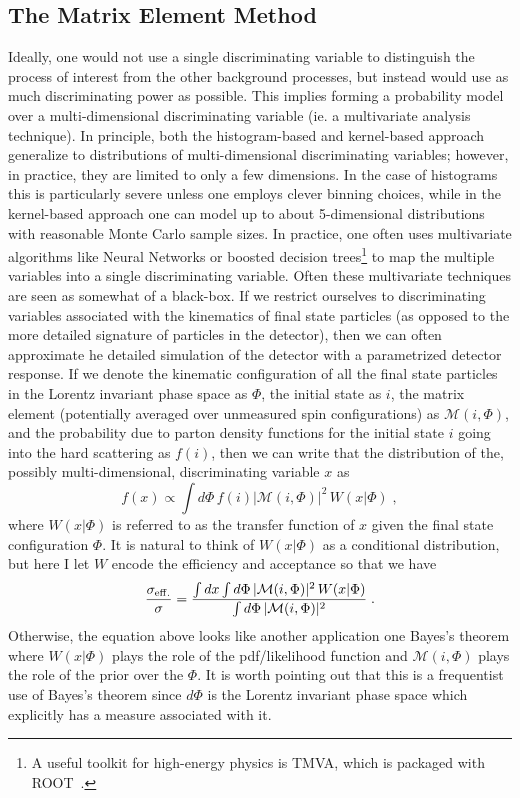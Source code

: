\documentclass{cernrep}
\begin{document}
\subsection{The Matrix Element Method}
Ideally, one would not use a single discriminating variable to distinguish the process of interest from the other background processes, but instead would use as much discriminating power as possible.  This implies forming a probability model over a multi-dimensional discriminating variable (ie. a multivariate analysis technique).  In principle, both the histogram-based and kernel-based approach generalize to distributions of multi-dimensional discriminating variables; however, in practice, they are limited to only a few dimensions. In the case of histograms this is particularly severe unless one employs clever binning choices, while in the kernel-based approach one can model up to about 5-dimensional distributions with reasonable Monte Carlo sample sizes.   In practice, one often uses multivariate algorithms like Neural Networks or boosted decision trees\footnote{A useful toolkit for high-energy physics is TMVA, which is packaged with ROOT~\cite{tmva}.} to map the multiple variables into a single discriminating variable.  Often these multivariate techniques are seen as somewhat of a black-box.  If we restrict ourselves to discriminating variables associated with the kinematics of final state particles (as opposed to the more detailed signature of particles in the detector), then we can often approximate he detailed simulation of the detector with a parametrized detector response.  If we denote the kinematic configuration of all the final state particles in the Lorentz invariant phase space as $\Phi$, the initial state as $i$,  the matrix element (potentially averaged over unmeasured spin configurations) as $\mathcal{M}(i,\Phi)$, and the probability due to parton density functions for the initial state $i$ going into the hard scattering  as $f(i)$, then we can write that the distribution of the, possibly multi-dimensional, discriminating variable $x$ as
\begin{equation}
f(x) \propto \int d\Phi \, f(i) |\mathcal{M}(i,\Phi)|^2 \, W(x | \Phi) \;,
\end{equation}
where $W(x|\Phi)$ is referred to as the transfer function of $x$ given the final state configuration $\Phi$.  It is natural to think of $W(x|\Phi)$ as a conditional distribution, but here I let $W$ encode the efficiency and acceptance so that we have
\begin{equation}
\frac{\sigma_{\rm eff.}}{\sigma} = \frac{\int dx \int d\Phi \, |\mathcal{M}(i,\Phi)|^2 \, W(x | \Phi) }{\int d\Phi \, |\mathcal{M}(i,\Phi)|^2 }\;.
\end{equation}
Otherwise, the equation above looks like another application one Bayes's theorem where $W(x|\Phi)$ plays the role of the pdf/likelihood function and $\mathcal{M}(i,\Phi)$ plays the role of the prior over the $\Phi$.  It is worth pointing out that this is a frequentist use of Bayes's theorem since $d\Phi$ is the Lorentz invariant phase space which explicitly has a measure associated with it.
\end{document}
